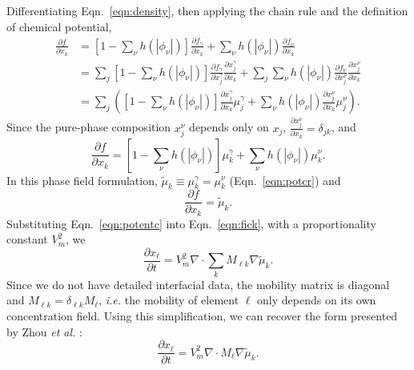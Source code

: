 \documentclass[10pt]{article}
\begin{document}
		Differentiating Eqn.~\ref{eqn:density}, then applying the chain rule and the definition of chemical potential,
		\begin{align}
			\frac{\partial f}{\partial x_k} &= \left[1-\sum_{\nu}h(|\phi_{\nu}|)\right]\frac{\partial f_{\gamma}}{\partial x_k}
			                                 + \sum_{\nu}h(|\phi_{\nu}|)\frac{\partial f_{\nu}}{\partial x_k}\\
			                                &= \sum_j\left[1-\sum_{\nu}h(|\phi_{\nu}|)\right]\frac{\partial f_{\gamma}}{\partial x_j^{\gamma}}\frac{\partial x_j^{\gamma}}{\partial x_k}
			                                 + \sum_j\sum_{\nu}h(|\phi_{\nu}|)\frac{\partial f_{\nu}}{\partial x_j^{\nu}}\frac{\partial x_j^{\nu}}{\partial x_k}\\
			                                &= \sum_j\left(\left[1-\sum_{\nu}h(|\phi_{\nu}|)\right]\frac{\partial x_j^{\gamma}}{\partial x_k}\mu_j^{\gamma}
			                                 + \sum_{\nu}h(|\phi_{\nu}|)\frac{\partial x_j^{\nu}}{\partial x_k}\mu_j^{\nu}\right).
		\end{align}
		Since the pure-phase composition $x_j^{\nu}$ depends only on $x_j$, $\frac{\partial x_j^{\nu}}{\partial x_k} = \delta_{jk}$, and
		\begin{equation}
			\frac{\partial f}{\partial x_k} = \left[1-\sum_{\nu}h(|\phi_{\nu}|)\right]\mu_k^{\gamma} + \sum_{\nu}h(|\phi_{\nu}|)\mu_k^{\nu}.
		\end{equation}
		In this phase field formulation, $\tilde{\mu}_k\equiv\mu_k^{\gamma}=\mu_k^{\nu}$ (Eqn.~\ref{eqn:potcr}) and
		\begin{equation}
			\frac{\partial f}{\partial x_k} = \tilde{\mu}_k.\label{eqn:potentc}
		\end{equation}
		Substituting Eqn.~\ref{eqn:potentc} into Eqn.~\ref{eqn:fick}, with a proportionality constant $V_m^2$, we 
		\begin{equation}
			\frac{\partial x_{\ell}}{\partial t} = V_m^2 \nabla\cdot\sum_k M_{\ell k}\nabla\tilde{\mu}_k.
		\end{equation}
		Since we do not have detailed interfacial data, the mobility matrix is diagonal and $M_{\ell k} = \delta_{\ell k}M_{\ell}$,
		\emph{i.e.} the mobility of element $\ell$ only depends on its own concentration field.
		Using this simplification, we can recover the form presented by Zhou \emph{et al.} \cite{Zhou2014}:
		\begin{equation}
			\frac{\partial x_{\ell}}{\partial t} = V_m^2 \nabla \cdot M_{\ell} \nabla \tilde{\mu}_k.\label{eqn:zhoudiff}
		\end{equation}
\end{document}
